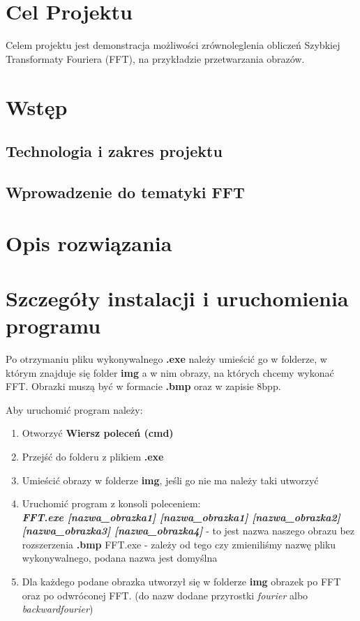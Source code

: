 \section{Cel Projektu}
Celem projektu jest demonstracja możliwości zrównoleglenia obliczeń Szybkiej Transformaty Fouriera (FFT), na przykładzie przetwarzania obrazów.
\section{Wstęp}
\subsection{Technologia i zakres projektu}
\subsection{Wprowadzenie do tematyki FFT}
\section{Opis rozwiązania}
\section{Szczegóły instalacji i uruchomienia programu}
Po otrzymaniu pliku wykonywalnego \textbf{.exe} należy umieścić go w folderze, w którym znajduje się folder \textbf{img} a w nim obrazy, na których chcemy wykonać FFT. Obrazki muszą być w formacie \textbf{.bmp} oraz w zapisie 8bpp. 

Aby uruchomić program należy:
\begin{enumerate}
	\item Otworzyć \textbf{Wiersz poleceń (cmd)}
	\item Przejść do folderu z plikiem \textbf{.exe}
	\item Umieścić obrazy w folderze \textbf{img}, jeśli go nie ma należy taki utworzyć
	\item Uruchomić program z konsoli poleceniem:\\
	 \textbf{\textit{FFT.exe [nazwa\_obrazka1] [nazwa\_obrazka1] [nazwa\_obrazka2] [nazwa\_obrazka3] [nazwa\_obrazka4]}}
	  - to jest nazwa naszego obrazu bez rozszerzenia \textbf{.bmp}
	 \subitem FFT.exe - zależy od tego czy zmieniliśmy nazwę pliku wykonywalnego, podana nazwa jest domyślna
	\item Dla każdego podane obrazka utworzył się w folderze \textbf{img} obrazek po FFT oraz po odwróconej FFT. (do nazw dodane przyrostki \textit{fourier} albo \textit{backwardfourier})
\end{enumerate} 
\clearpage\newpage

